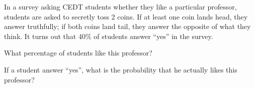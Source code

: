 \documentclass[a4paper, 10pt]{article}
\begin{document}
\begin{problem}
	In a survey asking CEDT students whether they like a particular professor, students are asked to secretly toss 2 coins.
	If at least one coin lands head, they answer truthfully;
	if both coins land tail, they answer the opposite of what they think.
	It turns out that 40\% of students answer ``yes'' in the survey.

	\begin{subproblems_alpha}
		\item What percentage of students like this professor?
		\item If a student answer ``yes'', what is the probability that he actually likes this professor?
	\end{subproblems_alpha}
\end{problem}
\end{document}
